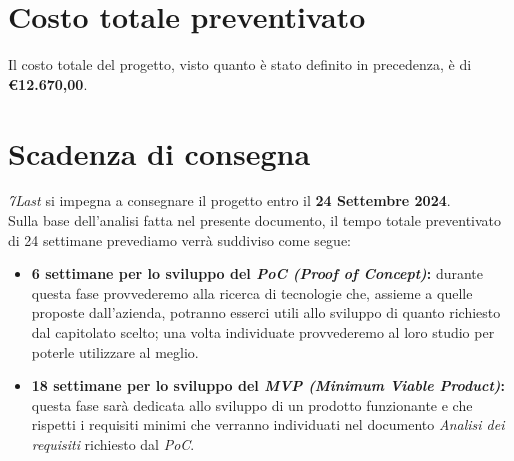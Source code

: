 \documentclass[italian,12pt]{article} %
\begin{document}
\section{Costo totale preventivato}
Il costo totale del progetto, visto quanto è stato definito in precedenza, è di \textbf{€12.670,00}.

\newpage

\section{Scadenza di consegna}
\textit{7Last} si impegna a consegnare il progetto entro il \textbf{24 Settembre 2024}. \\
Sulla base dell'analisi fatta nel presente documento, il tempo totale preventivato di 24 settimane prevediamo verrà suddiviso come segue:
\begin{itemize}
    \item \textbf{6 settimane per lo sviluppo del \textit{PoC (Proof of Concept)}:} durante questa fase provvederemo alla ricerca di tecnologie che, assieme a quelle proposte dall'azienda, potranno esserci utili allo sviluppo di quanto richiesto dal capitolato scelto; una volta individuate provvederemo al loro studio per poterle utilizzare al meglio.
    \item \textbf{18 settimane per lo sviluppo del \textit{MVP (Minimum Viable Product)}:} questa fase sarà dedicata allo sviluppo di un prodotto funzionante e che rispetti i requisiti minimi che verranno individuati nel documento \textit{Analisi dei requisiti} richiesto dal \textit{PoC}.
\end{itemize}
\end{document}
